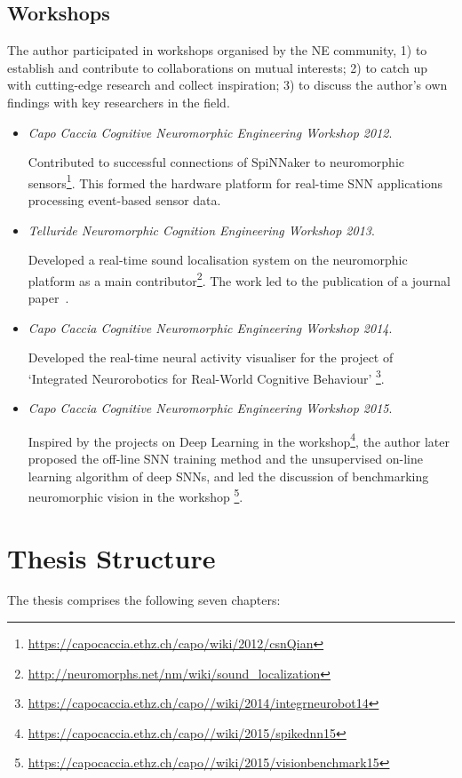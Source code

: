 \subsection{Workshops}
The author participated in workshops organised by the NE community, 1) to establish and contribute to collaborations on mutual interests; 2) to catch up with cutting-edge research and collect inspiration; 3) to discuss the author's own findings with key researchers in the field.
\begin{itemize}
	\item 
	\textit{Capo Caccia Cognitive Neuromorphic Engineering Workshop 2012}.

	Contributed to successful connections of SpiNNaker to neuromorphic sensors\footnote{\url{https://capocaccia.ethz.ch/capo/wiki/2012/csnQian}}. 
	This formed the hardware platform for real-time SNN applications processing event-based sensor data.

	\item 
	\textit{Telluride Neuromorphic Cognition Engineering Workshop 2013}.

	Developed a real-time sound localisation system on the neuromorphic platform as a main contributor\footnote{\url{http://neuromorphs.net/nm/wiki/sound_localization}}.
	The work led to the publication of a journal paper~\citep{lagorce2015breaking}.

	
	\item 
	\textit{Capo Caccia Cognitive Neuromorphic Engineering Workshop 2014}.

	Developed the real-time neural activity visualiser for the project of `Integrated Neurorobotics for Real-World Cognitive Behaviour' \footnote{\url{https://capocaccia.ethz.ch/capo//wiki/2014/integrneurobot14}}. 

	\item 
	\textit{Capo Caccia Cognitive Neuromorphic Engineering Workshop 2015}.

	Inspired by the projects on Deep Learning in the workshop\footnote{\url{https://capocaccia.ethz.ch/capo//wiki/2015/spikednn15}}, the author later proposed the off-line SNN training method and the unsupervised on-line learning algorithm of deep SNNs, and led the discussion of benchmarking neuromorphic vision in the workshop \footnote{\url{https://capocaccia.ethz.ch/capo//wiki/2015/visionbenchmark15}}. 	
\end{itemize}
\section{Thesis Structure}
The thesis comprises the following seven chapters:

